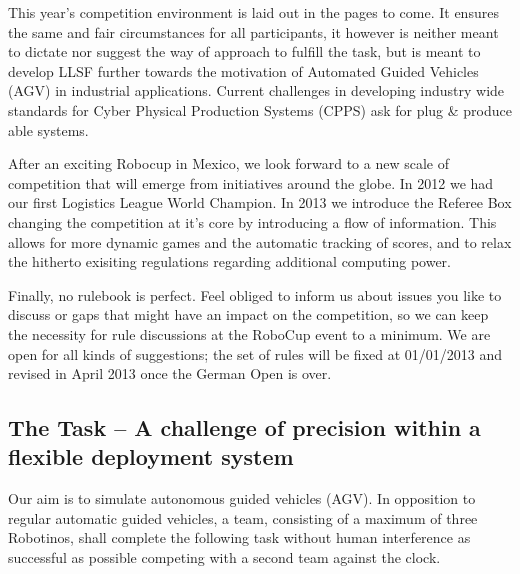 \documentclass[12pt,twoside]{article}
\begin{document}
This year’s competition environment is laid out in the pages to come.
It ensures the same and fair circumstances for all participants, it
however is neither meant to dictate nor suggest the way of approach to
fulfill the task, but is meant to develop LLSF further towards the
motivation of Automated Guided Vehicles (AGV) in industrial
applications. Current challenges in developing industry wide standards
for Cyber Physical Production Systems (CPPS) ask for plug \& produce
able systems.

After an exciting Robocup in Mexico, we look forward to a new scale of
competition that will emerge from initiatives around the globe. In
2012 we had our first Logistics League World Champion.  In 2013 we
introduce the Referee Box changing the competition at it's core by
introducing a flow of information.  This allows for more dynamic games
and the automatic tracking of scores, and to relax the hitherto
exisiting regulations regarding additional computing power.

Finally, no rulebook is perfect. Feel obliged to inform us about
issues you like to discuss or gaps that might have an impact on the
competition, so we can keep the necessity for rule discussions at the
RoboCup event to a minimum. We are open for all kinds of suggestions;
the set of rules will be fixed at 01/01/2013 and revised in April 2013
once the German Open is over.




\subsection{The Task -- A challenge of precision within a flexible
  deployment system}

Our aim is to simulate autonomous guided vehicles (AGV). In opposition
to regular automatic guided vehicles, a team, consisting of a maximum
of three Robotinos, shall complete the following task without human
interference as successful as possible competing with a second team
against the clock.
\end{document}

